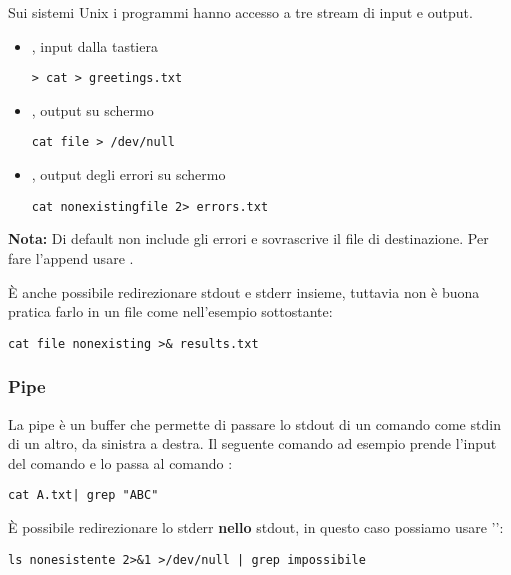\documentclass[../main.tex]{subfiles}
\begin{document}
Sui sistemi Unix i programmi hanno accesso a tre stream di input e output.
\begin{itemize}
    \item {} \code{[0]}, input dalla tastiera
    \begin{lstlisting}[style=bash]
        > cat > greetings.txt
    \end{lstlisting}
    \item {} \code{[1]}, output su schermo
    \begin{lstlisting}[style=bash]
        cat file > /dev/null
    \end{lstlisting}
    \item {} \code{[2]}, output degli errori su schermo
    \begin{lstlisting}[style=bash]
        cat nonexistingfile 2> errors.txt
    \end{lstlisting}
\end{itemize}
\textbf{Nota:} Di default  non include gli errori e sovrascrive il file di destinazione. Per fare l'append usare \code{>>}.

È anche possibile redirezionare stdout e stderr insieme, tuttavia non è buona pratica farlo in un file come nell'esempio sottostante:
\begin{lstlisting}[style=bash]
    cat file nonexisting >& results.txt
\end{lstlisting}

\subsubsection{Pipe}
La pipe è un buffer che permette di passare lo stdout di un comando come stdin di un altro, da sinistra a destra. Il seguente comando 
ad esempio prende l'input del comando  e lo passa al comando :
\begin{lstlisting}[style=bash]
    cat A.txt| grep "ABC"
\end{lstlisting}

È possibile redirezionare lo stderr \textbf{nello} stdout, in questo caso possiamo usare '':
\begin{lstlisting}[style=bash]
    ls nonesistente 2>&1 >/dev/null | grep impossibile
\end{lstlisting}
\end{document}
